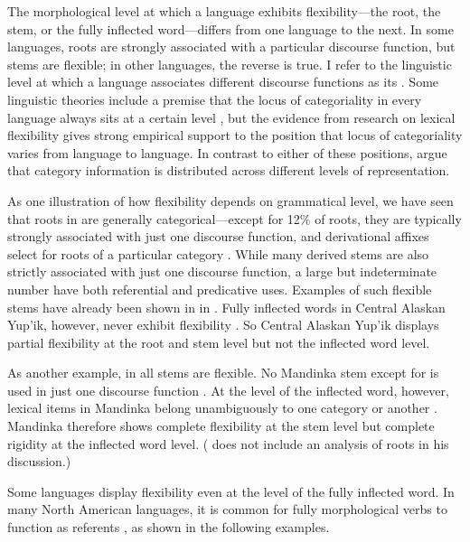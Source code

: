 The morphological level at which a language exhibits flexibility—the root, the stem, or the fully inflected word—differs from one language to the next. In some languages, roots are strongly associated with a particular discourse function, but stems are flexible; in other languages, the reverse is true. I refer to the linguistic level at which a language associates different discourse functions as its . Some linguistic theories include a premise that the locus of categoriality in every language always sits at a certain level \parencites{HalleMarantz1994}{Baker2003}{Baker2015}{BooijAudring2018}{Siddiqi2018}, but the evidence from research on lexical flexibility gives strong empirical support to the position that locus of categoriality varies from language to language. In contrast to either of these positions, \textcite{BlaszczakKlimekJankowskaMigdalski2015} argue that category information is distributed across different levels of representation.

As one illustration of how flexibility depends on grammatical level, we have seen that roots in  are generally categorical—except for 12\% of roots, they are typically strongly associated with just one discourse function, and derivational affixes select for roots of a particular category \parencite[162--167]{Mithun2017}. While many derived stems are also strictly associated with just one discourse function, a large but indeterminate number have both referential and predicative uses. Examples of such flexible stems have already been shown in  in . Fully inflected words in Central Alaskan Yup'ik, however, never exhibit flexibility \parencite[6]{Mithun2019}. So Central Alaskan Yup'ik displays partial flexibility at the root and stem level but not the inflected word level.

As another example, in  all stems are flexible. No Mandinka stem except for   is used in just one discourse function \parencite[46]{Creissels2017}. At the level of the inflected word, however, lexical items in Mandinka belong unambiguously to one category or another \parencite[37]{Creissels2017}. Mandinka therefore shows complete flexibility at the stem level but complete rigidity at the inflected word level. (\citeauthor{Creissels2017} does not include an analysis of roots in his discussion.)

Some languages display flexibility even at the level of the fully inflected word. In many North American languages, it is common for fully morphological verbs to function as referents \parencite{Hieberfc}, as shown in the following examples.

